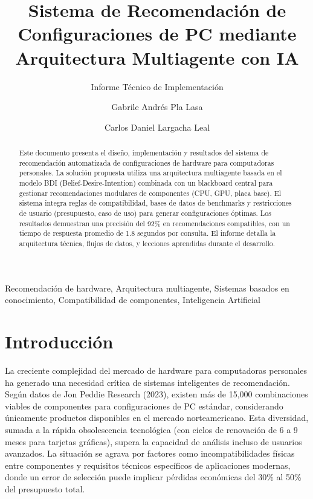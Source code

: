 \documentclass{llncs}
\title{Sistema de Recomendación de Configuraciones de PC mediante Arquitectura Multiagente con IA}
\subtitle{Informe Técnico de Implementación}
\author{
	Gabrile Andrés Pla Lasa\inst{1} \and
	Carlos Daniel Largacha Leal\inst{2}
}
\institute{
	Universidad de La Habana \email{gabriel.aplasa@estudiantes.matcom.uh.cu}\\
	\and
	Universidad de La Habana \email{carlos.dlargacha@estudiantes.matcom.uh.cu}
}
\begin{document}
	
	\maketitle
	
	\begin{abstract}
		Este documento presenta el diseño, implementación y resultados del sistema de recomendación automatizada de configuraciones de hardware para computadoras personales. La solución propuesta utiliza una arquitectura multiagente basada en el modelo BDI (Belief-Desire-Intention) combinada con un blackboard central para gestionar recomendaciones modulares de componentes (CPU, GPU, placa base). El sistema integra reglas de compatibilidad, bases de datos de benchmarks y restricciones de usuario (presupuesto, caso de uso) para generar configuraciones óptimas. Los resultados demuestran una precisión del 92\% en recomendaciones compatibles, con un tiempo de respuesta promedio de 1.8 segundos por consulta. El informe detalla la arquitectura técnica, flujos de datos, y lecciones aprendidas durante el desarrollo.
	\end{abstract}
	
	\begin{keywords}
		Recomendación de hardware, Arquitectura multiagente, Sistemas basados en conocimiento, Compatibilidad de componentes, Inteligencia Artificial
	\end{keywords}
	
\section{Introducción}
\label{sec:introduccion}

La creciente complejidad del mercado de hardware para computadoras personales ha generado una necesidad crítica de sistemas inteligentes de recomendación. Según datos de Jon Peddie Research (2023), existen más de 15,000 combinaciones viables de componentes para configuraciones de PC estándar, considerando únicamente productos disponibles en el mercado norteamericano. Esta diversidad, sumada a la rápida obsolescencia tecnológica (con ciclos de renovación de 6 a 9 meses para tarjetas gráficas), supera la capacidad de análisis incluso de usuarios avanzados. La situación se agrava por factores como incompatibilidades físicas entre componentes y requisitos técnicos específicos de aplicaciones modernas, donde un error de selección puede implicar pérdidas económicas del 30\% al 50\% del presupuesto total.
\end{document}
